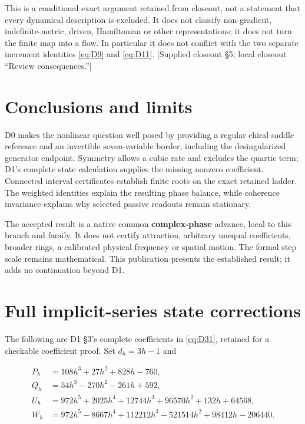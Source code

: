 \documentclass[11pt,a4paper]{article}
\begin{document}
This is a conditional exact argument retained from closeout, not a statement that every dynamical description is excluded. It does not classify non-gradient, indefinite-metric, driven, Hamiltonian or other representations; it does not turn the finite map into a flow. In particular it does not conflict with the two separate increment identities \eqref{eq:D9} and \eqref{eq:D11}. [Supplied closeout \S{}5; local closeout \textquotedblleft{}Review consequences.\textquotedblright{}]

\section{Conclusions and limits}

D0 makes the nonlinear question well posed by providing a regular chiral saddle reference and an invertible seven-variable border, including the desingularized generator endpoint. Symmetry allows a cubic rate and excludes the quartic term; D1's complete state calculation supplies the missing nonzero coefficient. Connected interval certificates establish finite roots on the exact retained ladder. The weighted identities explain the resulting phase balance, while coherence invariance explains why selected passive readouts remain stationary.

The accepted result is a native common \textbf{complex-phase} advance, local to this branch and family. It does not certify attraction, arbitrary unequal coefficients, broader rings, a calibrated physical frequency or spatial motion. The formal step scale remains mathematical. This publication presents the established result; it adds no continuation beyond D1.

\clearpage\appendix
\section{Full implicit-series state corrections}

The following are D1 \S{}3's complete coefficients in \eqref{eq:D31}, retained for a checkable coefficient proof. Set \(d_h=3h-1\) and

\[
\begin{aligned}
P_h&=108h^3+27h^2+828h-760,\\
Q_h&=54h^3-270h^2-261h+592,\\
U_h&=972h^5+2025h^4+12744h^3+96570h^2+132h+64568,\\
W_h&=972h^5-8667h^4+112212h^3-521514h^2+98412h-206440.
\end{aligned}\tag{DA1}\label{eq:DA1}
\]
\end{document}
